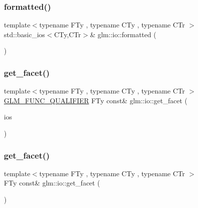 \subsubsection{\texorpdfstring{formatted()}{formatted()}\hspace{0.1cm}{\footnotesize\ttfamily [2/2]}}
{\footnotesize\ttfamily template$<$typename F\+Ty , typename C\+Ty , typename C\+Tr $>$ \\
std\+::basic\+\_\+ios$<$C\+Ty,C\+Tr$>$\& glm\+::io\+::formatted (\begin{DoxyParamCaption}\item[{std\+::basic\+\_\+ios$<$ C\+Ty, C\+Tr $>$ \&}]{ }\end{DoxyParamCaption})}

\mbox{\label{namespaceglm_1_1io_a9e8927cf032254b0eee4ec650286e1f9}} 
\subsubsection{\texorpdfstring{get\+\_\+facet()}{get\_facet()}\hspace{0.1cm}{\footnotesize\ttfamily [1/2]}}
{\footnotesize\ttfamily template$<$typename F\+Ty , typename C\+Ty , typename C\+Tr $>$ \\
\mbox{\hyperlink{setup_8hpp_a33fdea6f91c5f834105f7415e2a64407}{G\+L\+M\+\_\+\+F\+U\+N\+C\+\_\+\+Q\+U\+A\+L\+I\+F\+I\+ER}} F\+Ty const\& glm\+::io\+::get\+\_\+facet (\begin{DoxyParamCaption}\item[{std\+::basic\+\_\+ios$<$ C\+Ty, C\+Tr $>$ \&}]{ios }\end{DoxyParamCaption})}

\mbox{\label{namespaceglm_1_1io_a7ae96c71704bbf3c6e61543a7e731bc4}} 
\subsubsection{\texorpdfstring{get\+\_\+facet()}{get\_facet()}\hspace{0.1cm}{\footnotesize\ttfamily [2/2]}}
{\footnotesize\ttfamily template$<$typename F\+Ty , typename C\+Ty , typename C\+Tr $>$ \\
F\+Ty const\& glm\+::io\+::get\+\_\+facet (\begin{DoxyParamCaption}\item[{std\+::basic\+\_\+ios$<$ C\+Ty, C\+Tr $>$ \&}]{ }\end{DoxyParamCaption})}

